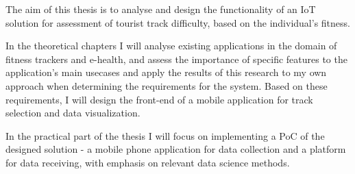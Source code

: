 The aim of this thesis is to analyse and design the functionality  of an IoT solution for assessment of tourist track difficulty, based on the individual's fitness.

In the theoretical chapters I will analyse existing applications in the domain of fitness trackers and e-health, and assess the importance of specific features to the application's main usecases
and apply the results of this research to my own approach when determining the requirements for the system.
Based on these requirements, I will design the front-end of a mobile application for track selection and data visualization.


In the practical part of the thesis I will focus on implementing a PoC of the designed solution - a mobile phone application for data collection and a platform for data receiving, with emphasis on relevant data science methods. 
